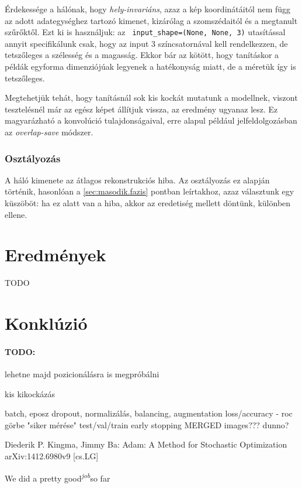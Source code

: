 Érdekessége a hálónak, hogy \textit{hely-invariáns}, azaz a kép koordinátáitól nem függ az adott
adategységhez tartozó kimenet, kizárólag a szomszédaitól és a megtanult szűrőktől.
Ezt ki is használjuk: az \texttt{ input\_shape=(None, None, 3)} utasítással annyit
specifikálunk csak, hogy az input 3 színcsatornával kell rendelkezzen, de tetszőleges
a szélesség és a magasság. Ekkor bár az kötött, hogy tanításkor a példák egyforma 
dimenziójúak legyenek a hatékonyság miatt, de a méretük így is tetszőleges.


Megtehetjük tehát, hogy tanításnál sok kis kockát mutatunk a modellnek, viszont tesztelésnél
már az egész képet állítjuk vissza, az eredmény ugyanaz lesz. Ez magyarázható a konvolúció 
tulajdonságaival, erre alapul például jelfeldolgozásban az \textit{overlap-save} módszer.



\subsubsection{Osztályozás}

A háló kimenete az átlagos rekonstrukciós hiba. Az osztályozás ez alapján történik,
hasonlóan a \ref{sec:masodik.fazis} pontban leírtakhoz, azaz választunk egy küszöböt:
ha ez alatt van a hiba, akkor az eredetiség mellett döntünk, különben ellene.



\newpage
\section{Eredmények}
TODO

\newpage
\section{Konklúzió}




\paragraph{TODO:}

lehetne majd pozicionálásra is megpróbálni


kis kikockázás

batch, eposz
dropout, normalizálás, balancing, augmentation
loss/accuracy - roc görbe "siker mérése"
test/val/train
early stopping
MERGED images??? dunno?



\newpage
\begin{thebibliography}{9}
	Diederik P. Kingma, Jimmy Ba:
	Adam: A Method for Stochastic Optimization
	arXiv:1412.6980v9 [cs.LG]
	
\end{thebibliography}




We did a pretty good\textsuperscript{\textit{job}}so far



